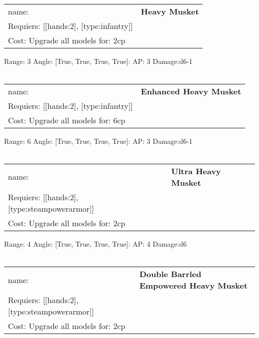 \ \\
\begin{tabular}{ll}
name: & {\bf Heavy Musket } \\
Requiers: [[hands:2], [type:infantry]] \\
Cost: Upgrade all models for: 2cp \\
\end{tabular}



Range: 3  Angle: [True, True, True, True]: AP: 3 Damage:d6-1 \\








\ \\
\begin{tabular}{ll}
name: & {\bf Enhanced Heavy Musket } \\
Requiers: [[hands:2], [type:infantry]] \\
Cost: Upgrade all models for: 6cp \\
\end{tabular}



Range: 6  Angle: [True, True, True, True]: AP: 3 Damage:d6-1 \\








\ \\
\begin{tabular}{ll}
name: & {\bf Ultra Heavy Musket } \\
Requiers: [[hands:2], [type:steampowerarmor]] \\
Cost: Upgrade all models for: 2cp \\
\end{tabular}



Range: 4  Angle: [True, True, True, True]: AP: 4 Damage:d6 \\








\ \\
\begin{tabular}{ll}
name: & {\bf Double Barrled Empowered Heavy Musket } \\
Requiers: [[hands:2], [type:steampowerarmor]] \\
Cost: Upgrade all models for: 2cp \\
\end{tabular}



